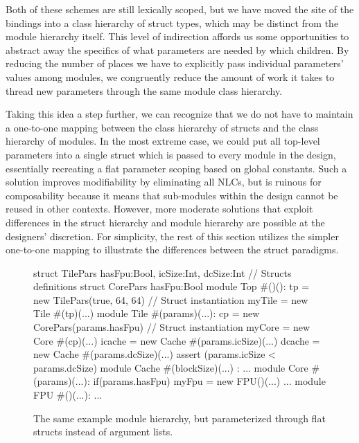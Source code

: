 Both of these schemes are still lexically scoped, but we have moved the site of the bindings into a class hierarchy of struct types,
which may be distinct from the module hierarchy itself.
This level of indirection affords us some opportunities to abstract away the specifics of what parameters are needed by which children.
By reducing the number of places we have to explicitly pass individual parameters' values among modules, we congruently reduce
the amount of work it takes to thread new parameters through the same module  class hierarchy.

Taking this idea a step further, we can recognize that we do not have to maintain a one-to-one mapping between the class hierarchy of structs and the class hierarchy of modules.
In the most extreme case, we could put all top-level parameters into a single struct which is passed to every module in the design,
essentially recreating a flat parameter scoping based on global constants.
Such a solution improves modifiability by eliminating all NLCs, but is ruinous for composability
because it means that sub-modules within the design cannot be reused in other contexts.
However, more moderate solutions that exploit differences in the struct hierarchy and module hierarchy are possible at the designers' discretion.
For simplicity, the rest of this section utilizes the simpler one-to-one mapping to illustrate the differences between the struct paradigms.

\begin{figure}
\centering
\begin{phdl}
struct TilePars {hasFpu:Bool, icSize:Int, dcSize:Int} // Structs definitions
struct CorePars {hasFpu:Bool}
module Top #()():
  tp = new TilePars(true, 64, 64)                     // Struct instantiation
  myTile = new Tile #(tp)(...)
module Tile #(params)(...):
  cp = new CorePars(params.hasFpu)                    // Struct instantiation
  myCore = new Core  #(cp)(...)
  icache = new Cache #(params.icSize)(...)
  dcache = new Cache #(params.dcSize)(...)
  assert (params.icSize < params.dcSize)
module Cache #(blockSize)(...) : ...
module Core #(params)(...):
  if(params.hasFpu) myFpu = new FPU()(...) ...
module FPU #()(...): ...
\end{phdl} 
\caption{The same example module hierarchy, but parameterized through flat structs instead of argument lists.}
\label{fig:flatstruct}
\end{figure}

